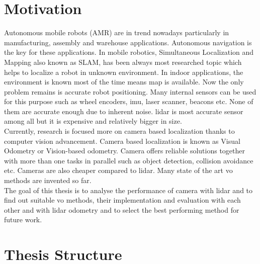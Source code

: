 \section{Motivation}
Autonomous mobile robots (AMR) are in trend nowadays particularly in manufacturing, assembly and warehouse applications. Autonomous navigation is the key for these applications. In mobile robotics, Simultaneous Localization and Mapping also known as SLAM, has been always most researched topic which helps to localize a robot in unknown environment. In indoor applications, the environment is known most of the time means map is available. Now the only problem remains is accurate robot positioning. Many internal sensors can be used for this purpose such as wheel encoders, \acrshort{imu}, laser scanner, beacons etc. None of them are accurate enough due to inherent noise. \acrshort{lidar} is most accurate sensor among all but it is expensive and relatively bigger in size.\\
\newline
Currently, research is focused more on camera based localization thanks to computer vision advancement. Camera based localization is known as Visual Odometry or Vision-based odometry. Camera offers reliable solutions together with more than one tasks in parallel such as object detection, collision avoidance etc. Cameras are also cheaper compared to \acrshort{lidar}. Many state of the art \acrshort{vo} methods are invented so far.\\
\newline
The goal of this thesis is to analyse the performance of camera with \acrshort{lidar} and to find out suitable \acrshort{vo} methods, their implementation and evaluation with each other and with \acrshort{lidar} odometry and to select the best performing method for future work.

\section{Thesis Structure}

